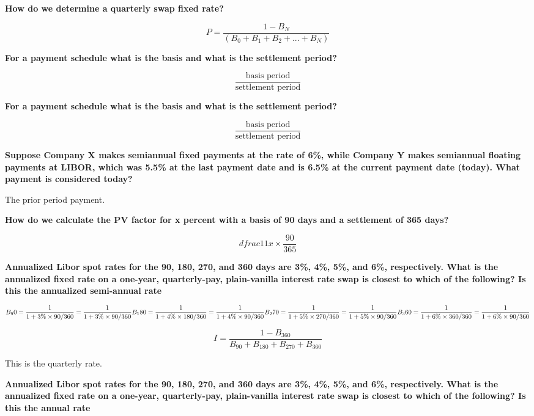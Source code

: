 \documentclass[12pt]{article}
\begin{document}
\begin{framed}
	
	\textbf{How do we determine a quarterly swap fixed rate?}
	
	$$
	P = \dfrac{1 - B_N}{(B_0 + B_1 + B_2 + ... + B_N)}
	$$
	
	
	
	\textbf{For a payment schedule what is the basis and what is the settlement period?}
	
	$$
	\dfrac{\text{basis period}}{\text{settlement period}}
	$$
	
		\textbf{For a payment schedule what is the basis and what is the settlement period?}
	
	$$
	\dfrac{\text{basis period}}{\text{settlement period}}
	$$
	
	\textbf{Suppose Company X makes semiannual fixed payments at the rate of 6\%, while Company Y makes semiannual floating payments at LIBOR, which was 5.5\% at the last payment date and is 6.5\% at the current payment date (today). What payment is considered today?}
	
	The prior period payment. 
	
	\textbf{How do we calculate the PV factor for x percent with a basis of 90 days and a settlement of 365 days?}
	
	$$
	dfrac{1}{1 x \times \dfrac{90}{365} }
	$$

	\begin{framed}
	\textbf{Annualized Libor spot rates for the 90, 180, 270, and 360 days are 3\%, 4\%, 5\%, and 6\%, respectively. What is the annualized fixed rate on a one-year, quarterly-pay, plain-vanilla interest rate swap is closest to which of the following? Is this the annualized semi-annual rate}
	
	$$
	B_90 = \dfrac{1}{1 + 3\% \times 90/360} = \dfrac{1}{1 + 3\% \times 90/360} \\
	B_180 = \dfrac{1}{1 + 4\% \times 180/360} = \dfrac{1}{1 + 4\% \times 90/360} \\
	B_270 = \dfrac{1}{1 + 5\% \times 270/360} = \dfrac{1}{1 + 5\% \times 90/360} \\
	B_360 = \dfrac{1}{1 + 6\% \times 360/360} = \dfrac{1}{1 + 6\% \times 90/360} \\
	$$
	
	$$
	I = \dfrac{1 - B_360}{B_90 + B_180 + B_270 + B_360}
	$$
	
	This is the quarterly rate.
	
	\textbf{Annualized Libor spot rates for the 90, 180, 270, and 360 days are 3\%, 4\%, 5\%, and 6\%, respectively. What is the annualized fixed rate on a one-year, quarterly-pay, plain-vanilla interest rate swap is closest to which of the following? Is this the annual rate}
	

\end{framed}
\end{framed}
\end{document}
